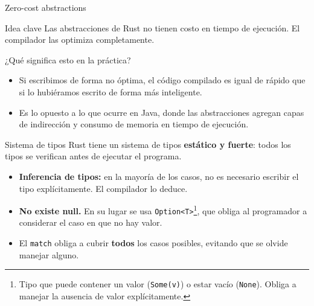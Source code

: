 \documentclass[11pt, aspectratio=169]{beamer}
\begin{document}
	\begin{frame}{Zero-cost abstractions}
		\begin{block}{Idea clave}
			Las abstracciones de Rust no tienen costo en tiempo de ejecución. El compilador las optimiza completamente.
		\end{block}

		\vspace{0.4cm}
		¿Qué significa esto en la práctica?
		\begin{itemize}
			\item Si escribimos de forma no óptima, el código compilado es igual de rápido que si lo hubiéramos escrito de forma más inteligente.

			\item Es lo opuesto a lo que ocurre en Java, donde las abstracciones agregan capas de indirección y consumo de memoria en tiempo de ejecución.

		\end{itemize}
	\end{frame}

	\begin{frame}{Sistema de tipos}
		Rust tiene un sistema de tipos \textbf{estático y fuerte}: todos los tipos se verifican antes de ejecutar el programa.
		
		\vspace{0.4cm}
		\begin{itemize}
			\item \textbf{Inferencia de tipos:} en la mayoría de los casos, no es necesario escribir el tipo explícitamente. El compilador lo deduce.
			\item \textbf{No existe null.} En su lugar se usa \texttt{Option<T>}\footnote{Tipo que puede contener un valor (\texttt{Some(v)}) o estar vacío (\texttt{None}). Obliga a manejar la ausencia de valor explícitamente.}, que obliga al programador a considerar el caso en que no hay valor.
			\item El \texttt{match} obliga a cubrir \textbf{todos} los casos posibles, evitando que se olvide manejar alguno.
		\end{itemize}
	\end{frame}
\end{document}
